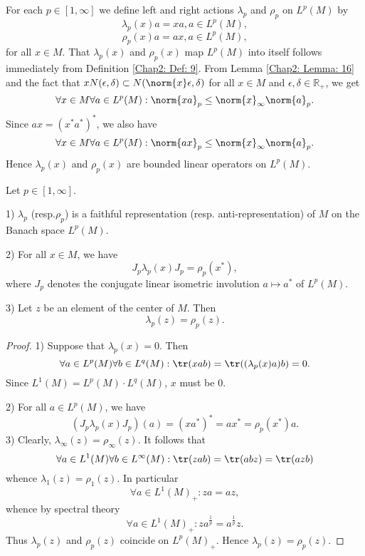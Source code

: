 For each $p\in [1,\infty]$ we define left and right actions $\lambda_p$ and $\rho_p$ on $L^p(M)$ by
\begin{equation}
    \lambda_p(x)a=xa, a\in L^p(M),
\end{equation}
\begin{equation}
    \rho_p(x)a=ax, a\in L^p(M),
\end{equation}
for all $x\in M$. That $\lambda_p(x)$ and $\rho_p(x)$ map $L^p(M)$ into itself follows immediately from Definition \ref{Chap2: Def: 9}. From Lemma \ref{Chap2: Lemma: 16} and the fact that $xN(\epsilon,\delta)\subset N(\norm{x}\epsilon,\delta)$ for all $x\in M$ and $\epsilon,\delta\in \mathbb{R}_+$, we get
\begin{equation}
    \forall x\in M \forall a\in L^p(M): \norm{xa}_p\leq \norm{x}_\infty \norm{a}_p.
\end{equation}
Since $ax=(x^*a^*)^*$, we also have
\begin{equation}
    \forall x\in M \forall a\in L^p(M): \norm{ax}_p\leq \norm{x}_\infty \norm{a}_p.
\end{equation}
Hence  $\lambda_p(x)$ and $\rho_p(x)$ are bounded linear operators on $L^p(M)$.
\begin{proposition}\label{Chap2: Prop: 34}
    Let $p\in [1,\infty]$.\par
    1) $\lambda_p$ (resp.$\rho_p$) is a faithful representation (resp. anti-representation) of $M$ on the Banach space $L^p(M)$.\par
    2) For all $x\in M$, we have
    \[
        J_p\lambda_p(x)J_p=\rho_p(x^*),
    \]
    where $J_p$ denotes the conjugate linear isometric involution $a\mapsto a^*$ of $L^p(M)$.\par
    3) Let $z$ be an element of the center of $M$. Then
    \[
        \lambda_p(z)=\rho_p(z).
    \]
\end{proposition}
\begin{proof}
    1) Suppose that $\lambda_p(x)=0$. Then
    \[
        \forall a\in L^p(M) \forall b\in L^q(M):\tr(xab)=\tr((\lambda_p(x)a)b)=0.
    \]
    Since $L^1(M)=L^p(M)\cdot L^q(M)$, $x$ must be $0$.\par
    2) For all $a\in L^p(M)$, we have
    \[
        (J_p\lambda_p(x)J_p)(a)=(xa^*)^*=ax^*=\rho_p(x^*)a.
    \]
    3) Clearly, $\lambda_\infty(z)=\rho_\infty(z)$. It follows that
    \[
        \forall a\in L^1(M)\forall b\in L^\infty(M):\tr(zab)=\tr(abz)=\tr(azb)
    \]
    whence $\lambda_1(z)=\rho_1(z)$. In particular
    \[
        \forall a\in L^1(M)_+:za=az,
    \]
    whence by spectral theory
    \[
        \forall a\in L^1(M)_+:za^\frac{1}{p}=a^\frac{1}{p}z.
    \]
    Thus $\lambda_p(z)$ and $\rho_p(z)$ coincide on $L^p(M)_+$. Hence $\lambda_p(z)=\rho_p(z)$.
\end{proof}
